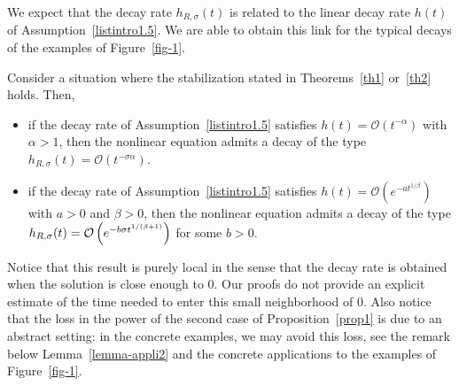 \documentclass[10pt]{amsart}
\theoremstyle{definition}\newtheorem{defi}[theo]{Definition}\newtheorem{rema}[theo]{Remark}\newtheorem{exam}[theo]{Example}\newtheorem{exem}[theo]{Example}\newtheorem{nota}[theo]{Notation}
\newcommand{\Oc}{\mathcal{O}}
\begin{document}
We expect that the decay rate $h_{R,\sigma}(t)$ is related to the linear decay rate $h(t)$ of Assumption~\eqref{listintro1.5}. We are able to obtain this link for the typical decays of the examples of Figure~\ref{fig-1}.


\begin{prop}\label{prop1}
Consider a situation where the stabilization stated in Theorems~\ref{th1} or~\ref{th2} holds. Then,
\begin{itemize}
\item if the decay rate of Assumption~\eqref{listintro1.5} satisfies $h(t)=\Oc({t^{-\alpha}})$ with $\alpha>1$, then the nonlinear equation admits a decay of the type $h_{R,\sigma}(t)= \Oc (t^{-\sigma\alpha})$.
\item if the decay rate of Assumption~\eqref{listintro1.5} satisfies $h(t)=\Oc \left(e^{-a {t^{1/\beta}}}\right)$ with $a>0$ and $\beta>0$, then the nonlinear equation admits a decay of the type $h_{R,\sigma}(t)\linebreak= \Oc \left(e^{-b\sigma t^{1/(\beta+1)}}\right)$ for some $b>0$.
\end{itemize}
\end{prop}


Notice that this result is purely local in the sense that the decay rate is obtained when the solution is close enough to $0$. Our proofs do not provide an explicit estimate of the time needed to enter this small neighborhood of $0$. Also notice that the loss in the power of the second case of Proposition~\ref{prop1} is due to an abstract setting: in the concrete examples, we may avoid this loss, see the remark below Lemma~\ref{lemma-appli2} and the concrete applications to the examples of Figure~\ref{fig-1}.
\end{document}
